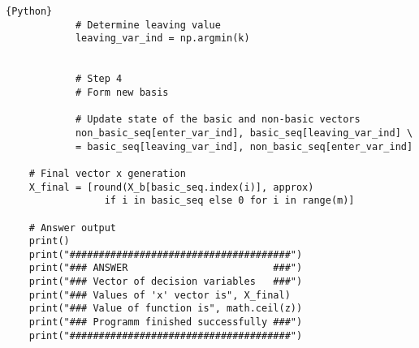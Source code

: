 \documentclass[12pt, legalpaper]{exam}
\begin{document}
\begin{lstlisting}{Python}
            # Determine leaving value
            leaving_var_ind = np.argmin(k)
    
    
            # Step 4
            # Form new basis
    
            # Update state of the basic and non-basic vectors
            non_basic_seq[enter_var_ind], basic_seq[leaving_var_ind] \
            = basic_seq[leaving_var_ind], non_basic_seq[enter_var_ind]
    
    # Final vector x generation
    X_final = [round(X_b[basic_seq.index(i)], approx)
                 if i in basic_seq else 0 for i in range(m)]
    
    # Answer output
    print()
    print("######################################")
    print("### ANSWER                         ###")
    print("### Vector of decision variables   ###")
    print("### Values of 'x' vector is", X_final)
    print("### Value of function is", math.ceil(z))
    print("### Programm finished successfully ###")
    print("######################################")
    
\end{lstlisting}
\end{document}
